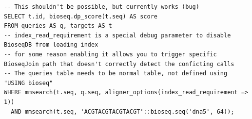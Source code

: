 \begin{minipage}{\linewidth}
\begin{lstlisting}[style=bioseq-search-sql,caption={Low priority bug that still exists in the code},label={lst:constant-extra-mmsearch}]
-- This shouldn't be possible, but currently works (bug)
SELECT t.id, bioseq.dp_score(t.seq) AS score
FROM queries AS q, targets AS t
-- index_read_requirement is a special debug parameter to disable BioseqDB from loading index
-- for some reason enabling it allows you to trigger specific BioseqJoin path that doesn't correctly detect the conficting calls
-- The queries table needs to be normal table, not defined using "USING bioseq"
WHERE mmsearch(t.seq, q.seq, aligner_options(index_read_requirement => 1))
  AND mmsearch(t.seq, 'ACGTACGTACGTACGT'::bioseq.seq('dna5', 64));
\end{lstlisting}
\end{minipage}
